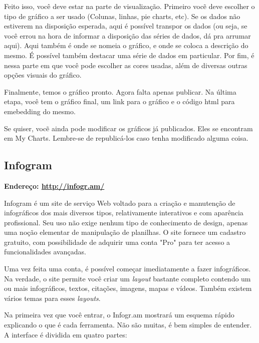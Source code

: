 \documentclass[12pt,onecolumn]{article}
\begin{document}
    Feito isso, você deve estar na parte de visualização. Primeiro vocẽ deve escolher
    o tipo de gráfico a ser usado (Colunas, linhas, pie charts, etc). Se os dados não
    estiverem na disposição esperada, aqui é possível transpor os dados (ou seja, se
    você errou na hora de informar a disposição das séries de dados, dá pra arrumar 
    aqui). Aqui também é onde se nomeia o gráfico, e onde se coloca a descrição do
    mesmo. É possível também destacar uma série de dados em particular. Por fim, 
    é nessa parte em que você pode escolher as cores usadas, além de diversas outras
    opções visuais do gráfico.
    
    Finalmente, temos o gráfico pronto. Agora falta apenas publicar. Na última etapa,
    você tem o gráfico final, um link para o gráfico e o código html para emebedding
    do mesmo.
    
    Se quiser, vocẽ ainda pode modificar os gráficos já publicados. Eles se encontram
    em My Charts. Lembre-se de republicá-los caso tenha modificado alguma coisa.

  \subsection{Infogram}
    \textbf{Endereço: \url{http://infogr.am/}}
    
    Infogram é um site de serviço Web voltado para a criação e manutenção de
    infográficos dos mais diversos tipos, relativamente interativos e com
    aparência profissional. Seu uso não exige nenhum tipo de conhecimento de
    design, apenas uma noção elementar de manipulação de planilhas. O site fornece
    um cadastro gratuito, com possibilidade de adquirir uma conta "Pro" para ter
    acesso a funcionalidades avançadas.
    
    Uma vez feita uma conta, é possível começar imediatamente a fazer
    infográficos. Na verdade, o site permite você criar um \textit{layout}
    bastante completo contendo um ou mais infográficos, textos, citações, imagens,
    mapas e vídeos. Também existem vários temas para esses \textit{layouts}.
    
    Na primeira vez que você entrar, o Infogr.am mostrará um esquema rápido
    explicando o que é cada ferramenta. Não são muitas, é bem simples de entender.
    A interface é dividida em quatro partes:
    
\end{document}
